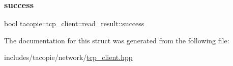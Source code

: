 \mbox{\label{structtacopie_1_1tcp__client_1_1read__result_a9bb917b8d210159a95655a6f8da8e96e}} 
\subsubsection{\texorpdfstring{success}{success}}
{\footnotesize\ttfamily bool tacopie\+::tcp\+\_\+client\+::read\+\_\+result\+::success}



The documentation for this struct was generated from the following file\+:\begin{DoxyCompactItemize}
\item 
includes/tacopie/network/\hyperlink{tcp__client_8hpp}{tcp\+\_\+client.\+hpp}\end{DoxyCompactItemize}
